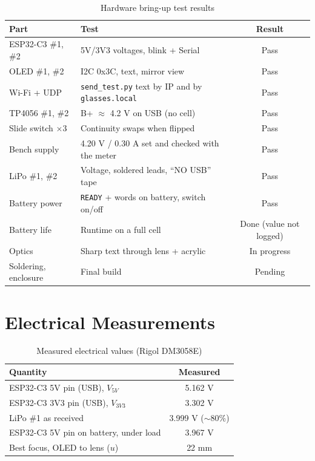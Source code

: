 \documentclass[12pt,a4paper]{report}
\begin{document}
\begin{table}[H]
\centering
\caption{Hardware bring-up test results}
\label{tab:bringup}
\begin{tabularx}{\linewidth}{L{3.4cm} X c}
\toprule
\textbf{Part} & \textbf{Test} & \textbf{Result} \\
\midrule
ESP32-C3 \#1, \#2 & 5V/3V3 voltages, blink + Serial & Pass \\
OLED \#1, \#2 & I2C 0x3C, text, mirror view & Pass \\
Wi-Fi + UDP & \texttt{send\_test.py} text by IP and by \texttt{glasses.local} & Pass \\
TP4056 \#1, \#2 & B+ $\approx$ 4.2 V on USB (no cell) & Pass \\
Slide switch $\times$3 & Continuity swaps when flipped & Pass \\
Bench supply & 4.20 V / 0.30 A set and checked with the meter & Pass \\
LiPo \#1, \#2 & Voltage, soldered leads, ``NO USB'' tape & Pass \\
Battery power & \texttt{READY} + words on battery, switch on/off & Pass \\
Battery life & Runtime on a full cell & Done (value not logged) \\
Optics & Sharp text through lens + acrylic & In progress \\
Soldering, enclosure & Final build & Pending \\
\bottomrule
\end{tabularx}
\end{table}

\section{Electrical Measurements}

\begin{table}[H]
\centering
\caption{Measured electrical values (Rigol DM3058E)}
\label{tab:meas}
\begin{tabular}{l c}
\toprule
\textbf{Quantity} & \textbf{Measured} \\
\midrule
ESP32-C3 5V pin (USB), $V_{5V}$ & 5.162 V \\
ESP32-C3 3V3 pin (USB), $V_{3V3}$ & 3.302 V \\
LiPo \#1 as received & 3.999 V ($\sim$80\%) \\
ESP32-C3 5V pin on battery, under load & 3.967 V \\
Best focus, OLED to lens ($u$) & 22 mm \\
\bottomrule
\end{tabular}
\end{table}
\end{document}
